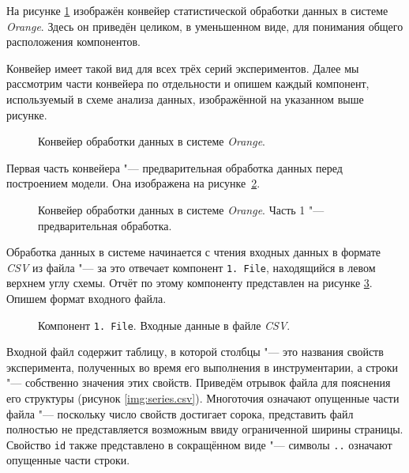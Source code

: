 На рисунке \ref{img:series30} изображён конвейер статистической обработки данных в системе \textit{Orange}. Здесь он приведён целиком, в уменьшенном виде, для понимания общего расположения компонентов.

Конвейер имеет такой вид для всех трёх серий экспериментов. Далее мы рассмотрим части конвейера по отдельности и опишем каждый компонент, используемый в схеме анализа данных, изображённой на указанном выше рисунке.

\begin{figure}[tbp]
    \caption{Конвейер обработки данных в системе \textit{Orange}.}
    \label{img:series30}
\end{figure}

Первая часть конвейера "--- предварительная обработка данных перед построением модели. Она изображена на рисунке~\ref{img:series30-1}.

\begin{figure}[tbp]
    \caption{Конвейер обработки данных в системе \textit{Orange}. Часть 1 "--- предварительная обработка.}
    \label{img:series30-1}
\end{figure}

Обработка данных в системе начинается с чтения входных данных в формате \textit{CSV} из файла "--- за это отвечает компонент \texttt{1.\,File}, находящийся в левом верхнем углу схемы. Отчёт по этому компоненту представлен на рисунке \ref{img:1-File}. Опишем формат входного файла.

\begin{figure}[tbp]
    \caption{Компонент \texttt{1.\,File}. Входные данные в файле \textit{CSV}.}
    \label{img:1-File}
\end{figure}

Входной файл содержит таблицу, в которой столбцы "--- это названия свойств эксперимента, полученных во время его выполнения в инструментарии, а строки "--- собственно значения этих свойств. Приведём отрывок файла для пояснения его структуры (рисунок \ref{img:series.csv}). Многоточия означают опущенные части файла "--- поскольку число свойств достигает сорока, представить файл полностью не представляется возможным ввиду ограниченной ширины страницы. Свойство \texttt{id} также представлено в сокращённом виде "--- символы \texttt{..} означают опущенные части строки.

